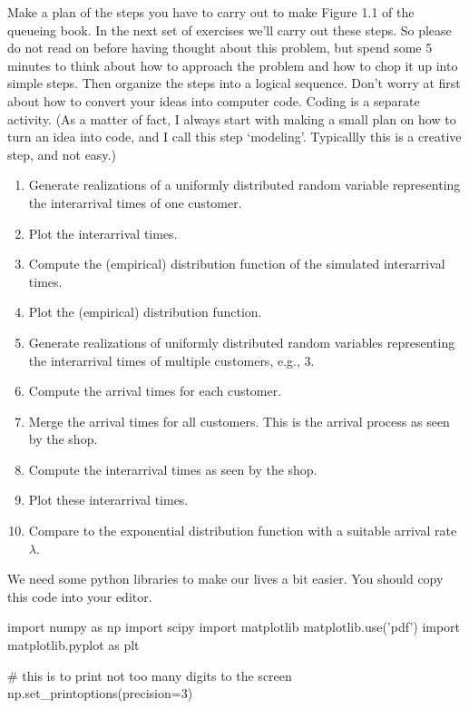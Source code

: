 \documentclass{scrartcl}
\begin{document}
\begin{exercise}
  Make a plan of the steps you have to carry out to make Figure 1.1 of the queueing book.
  In the next set of exercises we'll carry out these steps.
  So please do not read on before having thought about this problem, but spend some 5 minutes to think about how to approach the problem and how to chop it up into simple steps.
  Then organize the steps into a logical sequence.
  Don't worry at first about how to convert your ideas into computer code.
  Coding is a separate activity.
  (As a matter of fact, I always start with making a small plan on how to turn an idea into code, and I call this step `modeling'.
  Typicallly this is a creative step, and not easy.)

  \begin{solution}
    \begin{enumerate}
    \item Generate realizations of a uniformly distributed random variable representing the interarrival times of one customer.
    \item Plot the interarrival times.
    \item Compute the (empirical) distribution function of the simulated interarrival times.
    \item Plot the (empirical) distribution function.
    \item Generate realizations of uniformly distributed random variables representing the interarrival times of multiple customers, e.g., 3. 
    \item Compute the arrival times for each customer.
    \item Merge  the arrival times for all customers. This is the arrival process as seen by the shop.
    \item Compute the interarrival times as seen by the shop.
    \item Plot these interarrival times.
    \item Compare to the exponential distribution function with a suitable arrival rate $\lambda$. 
    \end{enumerate}
  \end{solution}
\end{exercise}

We need some python libraries to make our lives a bit easier. You should copy this code into your editor.

\begin{pyblock}
import numpy as np
import scipy
import matplotlib
matplotlib.use('pdf') 
import matplotlib.pyplot as plt

# this is to print not too many digits to the screen
np.set_printoptions(precision=3) 
\end{pyblock}
\end{document}
